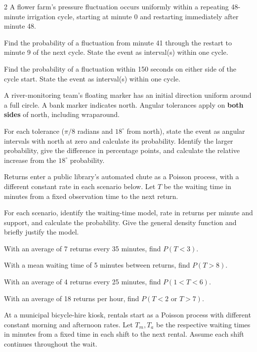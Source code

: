 \begin{multicols}{2}
A flower farm's pressure fluctuation occurs uniformly within a repeating 48-minute irrigation cycle, starting at minute 0 and restarting immediately after minute 48.

Find the probability of a fluctuation from minute 41 through the restart to minute 9 of the next cycle. State the event as interval(s) within one cycle. 

Find the probability of a fluctuation within 150 seconds on either side of the cycle start. State the event as interval(s) within one cycle. 


\begin{minipage}{\linewidth}

A river-monitoring team's floating marker has an initial direction uniform around a full circle. A bank marker indicates north. Angular tolerances apply on \textbf{both sides} of north, including wraparound.

For each tolerance ($\pi/8$ radians and $18^\circ$ from north), state the event as angular intervals with north at zero and calculate its probability. Identify the larger probability, give the difference in percentage points, and calculate the relative increase from the $18^\circ$ probability. 
\end{minipage}\par


Returns enter a public library's automated chute as a Poisson process, with a different constant rate in each scenario below. Let $T$ be the waiting time in minutes from a fixed observation time to the next return.

For each scenario, identify the waiting-time model, rate in returns per minute and support, and calculate the probability. Give the general density function and briefly justify the model.

With an average of 7 returns every 35 minutes, find $P(T<3)$. 

With a mean waiting time of 5 minutes between returns, find $P(T>8)$. 

With an average of 4 returns every 25 minutes, find $P(1<T<6)$. 

With an average of 18 returns per hour, find $P(T<2\text{ or }T>7)$. 


At a municipal bicycle-hire kiosk, rentals start as a Poisson process with different constant morning and afternoon rates. Let $T_m,T_a$ be the respective waiting times in minutes from a fixed time in each shift to the next rental. Assume each shift continues throughout the wait.


\end{multicols}
